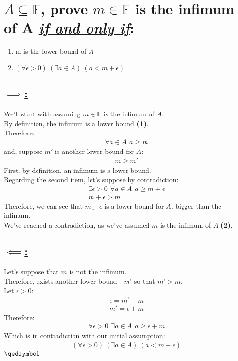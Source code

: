 \documentclass[a4paper, 12pt]{article}
\newcommand{\sub}[1]{\subsection{\underline{#1}}}
\newcommand{\F}{\ensuremath{\mathbb{F}}}
\newcommand{\eq}[1]{\begin{align*}#1\end{align*}}
\renewcommand{\qed}{\hfill\(\qedsymbol\)}
\begin{document}
\begin{titlepage}
    
\end{titlepage}

\section{
$A\subseteq\F$, prove $m\in\F$ is the infimum of A \underline{\textit{if and only if}}:}
\begin{enumerate}
    \item m is the lower bound of $A$
    \item $(\forall\epsilon>0)~(\exists{a}\in{A})~(a<m+\epsilon)$
\end{enumerate}
\sub{$\implies$:}
We'll start with assuming $m\in\F$ is the infimum of $A$.\\
By definition, the infimum is a lower bound \textbf{(1)}.\\
Therefore: \eq{\forall{a}\in{A}~~a\geq{m}}
and, suppose $m'$ is another lower bound for $A$: \eq{m\geq{m'}}
First, by definition, an infimum is a lower bound.\\
Regarding the second item, let's suppose by contradiction:
\eq{\exists\epsilon>0~~\forall{a}\in{A}~~a\geq{m+\epsilon}\\m+\epsilon>m}
Therefore, we can see that $\underline{m+\epsilon}$ is a lower bound for $A$, bigger than the infimum.\\
We've reached a contradiction, as we've assumed $m$ is the infimum of $A$ \textbf{(2)}.
\sub{$\impliedby$:}
Let's suppose that $m$ is not the infimum.\\
Therefore, exists another lower-bound - $m'$ so that $m'>m$.\\
Let $\epsilon>0$: \eq{\epsilon=m'-m\\m'=\epsilon+m}
Therefore: \eq{\forall\epsilon>0~~\exists{a}\in{A}~~a\geq\epsilon+m}
Which is in contradiction with our initial assumption: \eq{(\forall\epsilon>0)~(\exists{a}\in{A})~(a<m+\epsilon)}
\qed\pagebreak

\end{document}
